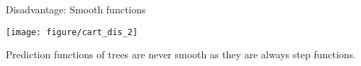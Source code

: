 \documentclass[11pt,compress,t,notes=noshow, xcolor=table]{beamer}
\begin{document}
\begin{vbframe}{Disadvantage: Smooth functions}
\begin{knitrout}\scriptsize
{}\color{fgcolor}

{\centering \texttt{[image: figure/cart\_dis\_2]} 

}



\end{knitrout}
Prediction functions of trees are never smooth as they are always step functions.
\end{vbframe}




\end{document}
